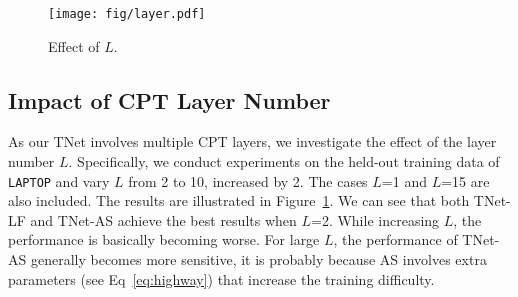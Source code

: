 \documentclass[11pt,a4paper]{article}
\begin{document}
\begin{figure}[!t]
    \centering
    \texttt{[image: fig/layer.pdf]}
\caption{Effect of $L$.}
    \label{fig:layer}
\end{figure}

\subsection{Impact of CPT Layer Number}
As our TNet involves multiple CPT layers, we investigate the effect of the layer number $L$. Specifically, we conduct experiments on the held-out training data of \texttt{LAPTOP} and vary $L$ from 2 to 10, increased by 2. The cases $L$=1 and $L$=15 are also included. The results are illustrated in Figure~\ref{fig:layer}. We can see that both TNet-LF and TNet-AS achieve the best results when $L$=2. While increasing $L$, the performance is basically becoming worse. For large $L$, the performance of TNet-AS generally becomes more sensitive, it is probably because AS involves extra parameters (see Eq~\ref{eq:highway}) that increase the training difficulty.  





 
\end{document}
